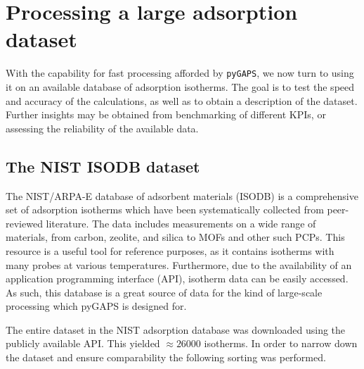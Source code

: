 
\section{Processing a large adsorption dataset}

With the capability for fast processing
afforded by \texttt{pyGAPS}, we now turn to using it on an
available database of adsorption isotherms. The goal is to
test the speed and accuracy of the calculations, as well
as to obtain a description of the dataset. Further insights
may be obtained from benchmarking of different KPIs, or
assessing the reliability of the available data.

\subsection{The NIST ISODB dataset}

The NIST/ARPA-E database of adsorbent materials (ISODB) is a comprehensive
set of adsorption isotherms which have been systematically
collected from peer-reviewed literature. The data includes
measurements on a wide range of materials, from carbon, zeolite,
and silica to MOFs and other such PCPs. This resource is a useful
tool for reference purposes, as it contains isotherms with many probes
at various temperatures. Furthermore, due to the availability of an
application programming interface (API), isotherm data can be easily
accessed. As such, this database is a great
source of data for the kind of large-scale processing which pyGAPS
is designed for.

The entire dataset in the NIST adsorption database was downloaded using the
publicly available API. This yielded \(\approx \! 26000\) isotherms.
In order to narrow down the dataset and ensure comparability
the following sorting was performed.

